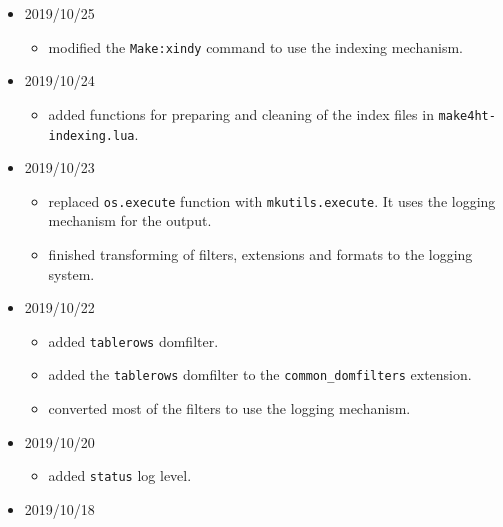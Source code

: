 \begin{itemize}
  \begin{itemize}
  \tightlist
  \item
    version \texttt{0.3} released.
  \item
    added \texttt{Make:makeindex}, \texttt{Make:xindex} and
    \texttt{Make:bibtex} commands.
  \end{itemize}
\item
  2019/10/25

  \begin{itemize}
  \tightlist
  \item
    modified the \texttt{Make:xindy} command to use the indexing
    mechanism.
  \end{itemize}
\item
  2019/10/24

  \begin{itemize}
  \tightlist
  \item
    added functions for preparing and cleaning of the index files in
    \texttt{make4ht-indexing.lua}.
  \end{itemize}
\item
  2019/10/23

  \begin{itemize}
  \tightlist
  \item
    replaced \texttt{os.execute} function with \texttt{mkutils.execute}.
    It uses the logging mechanism for the output.
  \item
    finished transforming of filters, extensions and formats to the
    logging system.
  \end{itemize}
\item
  2019/10/22

  \begin{itemize}
  \tightlist
  \item
    added \texttt{tablerows} domfilter.
  \item
    added the \texttt{tablerows} domfilter to the
    \texttt{common\_domfilters} extension.
  \item
    converted most of the filters to use the logging mechanism.
  \end{itemize}
\item
  2019/10/20

  \begin{itemize}
  \tightlist
  \item
    added \texttt{status} log level.
  \end{itemize}
\item
  2019/10/18


\end{itemize}
